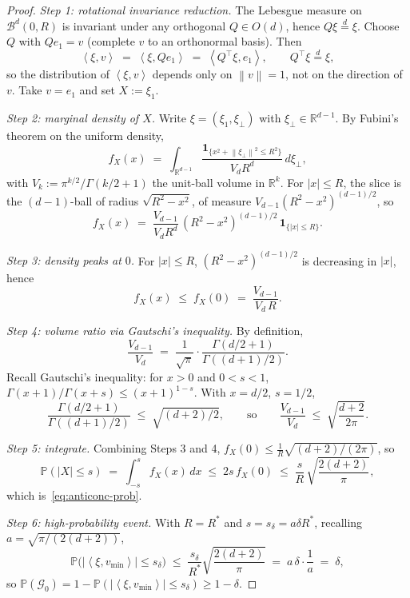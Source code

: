 \documentclass[11pt,a4paper]{article}
\theoremstyle{plain}
\theoremstyle{definition}
\newcommand{\R}{\mathbb{R}}
\newcommand{\norm}[1]{\left\|#1\right\|}
\newcommand{\inner}[2]{\left\langle #1,#2 \right\rangle}
\newcommand{\vmin}{v_{\min}}
\newcommand{\sdel}{s_{\delta}}
\renewcommand{\Pr}{\mathbb{P}}
\newcommand{\indic}[1]{\mathbf{1}_{\{#1\}}}
\newcommand{\Rstar}{R^{*}}
\begin{document}
\begin{proof}
\emph{Step 1: rotational invariance reduction.}
The Lebesgue measure on $\mathcal{B}^{d}(0,R)$ is invariant under any
orthogonal $Q\in O(d)$, hence $Q\xi\stackrel{d}{=}\xi$. Choose $Q$ with
$Qe_{1}=v$ (complete $v$ to an orthonormal basis). Then
\[
\inner{\xi}{v} \;=\; \inner{\xi}{Qe_{1}} \;=\; \inner{Q^{\top}\xi}{e_{1}},
\qquad Q^{\top}\xi\stackrel{d}{=}\xi,
\]
so the distribution of $\inner{\xi}{v}$ depends only on $\norm{v}=1$, not on
the direction of $v$. Take $v=e_{1}$ and set $X:=\xi_{1}$.

\emph{Step 2: marginal density of $X$.}
Write $\xi=(\xi_{1},\xi_{\perp})$ with $\xi_{\perp}\in\R^{d-1}$. By Fubini's
theorem on the uniform density,
\[
f_{X}(x)
\;=\; \int_{\R^{d-1}}\frac{\indic{x^{2}+\norm{\xi_{\perp}}^{2}\le R^{2}}}{V_{d}R^{d}}\,d\xi_{\perp},
\]
with $V_{k}:=\pi^{k/2}/\Gamma(k/2+1)$ the unit-ball volume in $\R^{k}$. For
$|x|\le R$, the slice is the $(d-1)$-ball of radius $\sqrt{R^{2}-x^{2}}$, of
measure $V_{d-1}(R^{2}-x^{2})^{(d-1)/2}$, so
\begin{equation}\label{eq:marginal-density}
f_{X}(x) \;=\; \frac{V_{d-1}}{V_{d}R^{d}}\,(R^{2}-x^{2})^{(d-1)/2}\,\indic{|x|\le R}.
\end{equation}

\emph{Step 3: density peaks at $0$.}
For $|x|\le R$, $(R^{2}-x^{2})^{(d-1)/2}$ is decreasing in $|x|$, hence
\[
f_{X}(x)\;\le\; f_{X}(0) \;=\; \frac{V_{d-1}}{V_{d}\,R}.
\]

\emph{Step 4: volume ratio via Gautschi's inequality.}
By definition,
\[
\frac{V_{d-1}}{V_{d}}
\;=\; \frac{1}{\sqrt{\pi}}\cdot\frac{\Gamma(d/2+1)}{\Gamma((d+1)/2)}.
\]
Recall Gautschi's inequality: for $x>0$ and $0<s<1$,
$\Gamma(x+1)/\Gamma(x+s)\le(x+1)^{1-s}$. With $x=d/2$, $s=1/2$,
\[
\frac{\Gamma(d/2+1)}{\Gamma((d+1)/2)} \;\le\; \sqrt{(d+2)/2},
\qquad\text{so}\qquad
\frac{V_{d-1}}{V_{d}} \;\le\; \sqrt{\frac{d+2}{2\pi}}.
\]

\emph{Step 5: integrate.}
Combining Steps 3 and 4, $f_{X}(0)\le \frac{1}{R}\sqrt{(d+2)/(2\pi)}$, so
\[
\Pr(|X|\le s) \;=\; \int_{-s}^{s}f_{X}(x)\,dx
\;\le\; 2s\,f_{X}(0)
\;\le\; \frac{s}{R}\,\sqrt{\frac{2(d+2)}{\pi}},
\]
which is~\eqref{eq:anticonc-prob}.

\emph{Step 6: high-probability event.}
With $R=\Rstar$ and $s=\sdel=a\delta \Rstar$, recalling
$a = \sqrt{\pi/(2(d+2))}$,
\[
\Pr\bigl(|\inner{\xi}{\vmin}|\le\sdel\bigr)
\;\le\; \frac{\sdel}{\Rstar}\sqrt{\frac{2(d+2)}{\pi}}
\;=\; a\,\delta\cdot\frac{1}{a}
\;=\; \delta,
\]
so $\Pr(\mathcal{G}_{0})=1-\Pr(|\inner{\xi}{\vmin}|\le\sdel)\ge 1-\delta$.
\end{proof}
\end{document}
